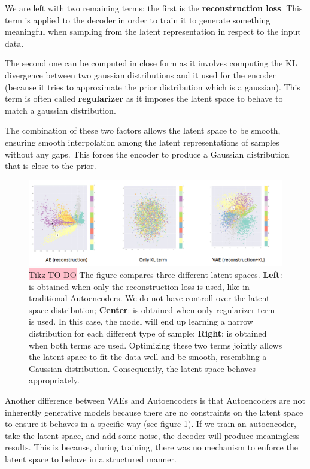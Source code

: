 We are left with two remaining terms: the first is the \textbf{reconstruction loss}. This term is applied to the decoder in order to train it to generate something meaningful when sampling from the latent representation in respect to the input data.

The second one can be computed in close form as it involves computing the KL divergence between  two gaussian distributions and it used for the encoder (because it tries to approximate the prior distribution which is a gaussian). This term is often called \textbf{regularizer} as it imposes the latent space to behave to match a gaussian distribution.


The combination of these two factors allows the latent space to be smooth, ensuring smooth interpolation among the latent representations of samples without any gaps. This forces the encoder to produce a Gaussian distribution that is close to the prior.

\begin{figure}[!htbp]
    \centering
    \includegraphics[width=\linewidth]{tikz/VAE latent spaces.png}
    \caption{{\color{red}\colorbox{pink}{Tikz TO-DO}} The figure compares three different latent spaces. \textbf{Left}: is obtained when only the reconstruction loss is used, like in traditional Autoencoders. We do not have controll over the latent space distribution; \textbf{Center}: is obtained when only regularizer term is used. In this case, the model will end up learning a narrow distribution for each different type of sample; \textbf{Right}: is obtained when both terms are used. Optimizing these two terms jointly allows the latent space to fit the data well and be smooth, resembling a Gaussian distribution. Consequently, the latent space behaves appropriately.}
    \label{fig:VAE-latent-spaces}
\end{figure}



Another difference between VAEs and Autoencoders is that Autoencoders are not inherently generative models because there are no constraints on the latent space to ensure it behaves in a specific way (see figure \ref{fig:VAE-latent-spaces}). If we train an autoencoder, take the latent space, and add some noise, the decoder will produce meaningless results. This is because, during training, there was no mechanism to enforce the latent space to behave in a structured manner.

